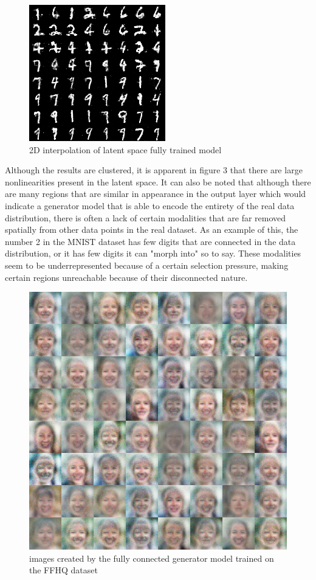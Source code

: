 \begin{figure}[h!]
    \centering
    \includegraphics{media/interp}
    \caption{2D interpolation of latent space fully trained model}
    \label{fig:mnist_interp}
\end{figure}

Although the results are clustered, it is apparent in figure 3 that there are large nonlinearities
present in the latent space.
It can also be noted that although there are many regions that are similar in appearance in the
output layer which would indicate a generator model that is able to encode the entirety of the real
data distribution, there is often a lack of certain modalities that are far removed spatially
from other data points in the real dataset.
As an example of this, the number 2 in the MNIST dataset has few digits that are connected in the
data distribution, or it has few digits it can "morph into" so to say.
These modalities seem to be underrepresented because of a certain selection pressure, making
certain regions unreachable because of their disconnected nature.

\begin{figure}
    \centering
    \includegraphics[width=\linewidth]{media/ffhq_fc}
    \caption{images created by the fully connected generator model trained on the FFHQ dataset}
    \label{fig:ffhq_fc}
\end{figure}

